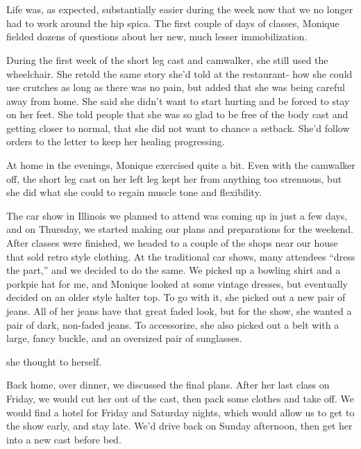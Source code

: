 \chapter{~}

Life was, as expected, substantially easier during the week now that we no longer had to work
around the hip spica. The first couple of days of classes, Monique fielded dozens of questions
about her new, much lesser immobilization.

During the first week of the short leg cast and camwalker, she still used the wheelchair. She
retold the same story she'd told at the restaurant- how she could use crutches as long as there
was no pain, but added that she was being careful away from home. She said she didn't want to
start hurting and be forced to stay on her feet. She told people that she was so glad to be free
of the body cast and getting closer to normal, that she did not want to chance a setback. She'd
follow orders to the letter to keep her healing progressing.

At home in the evenings, Monique exercised quite a bit. Even with the camwalker off, the short
leg cast on her left leg kept her from anything too strenuous, but she did what she could to
regain muscle tone and flexibility.

The car show in Illinois we planned to attend was coming up in just a few days, and on
Thursday, we started making our plans and preparations for the weekend. After classes were
finished, we headed to a couple of the shops near our house that sold retro style clothing. At
the traditional car shows, many attendees ``dress the part,'' and we decided to do the same. We
picked up a bowling shirt and a porkpie hat for me, and Monique looked at some vintage dresses,
but eventually decided on an older style halter top. To go with it, she picked out a new pair of
jeans. All of her jeans have that great faded look, but for the show, she wanted a pair of dark,
non-faded jeans. To accessorize, she also picked out a belt with a large, fancy buckle, and an
oversized pair of sunglasses.

 she
thought to herself.

Back home, over dinner, we discussed the final plans. After her last class on Friday, we would
cut her out of the cast, then pack some clothes and take off. We would find a hotel for Friday
and Saturday nights, which would allow us to get to the show early, and stay late. We'd drive
back on Sunday afternoon, then get her into a new cast before bed.

